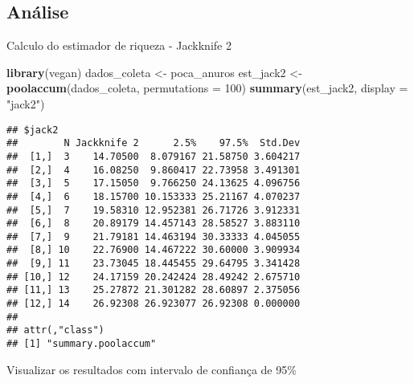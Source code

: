 \documentclass[
]{book}
\newenvironment{Shaded}{\begin{snugshade}}{\end{snugshade}}
\newcommand{\DataTypeTok}[1]{\textcolor[rgb]{0.13,0.29,0.53}{#1}}
\newcommand{\DecValTok}[1]{\textcolor[rgb]{0.00,0.00,0.81}{#1}}
\newcommand{\KeywordTok}[1]{\textcolor[rgb]{0.13,0.29,0.53}{\textbf{#1}}}
\newcommand{\NormalTok}[1]{#1}
\newcommand{\StringTok}[1]{\textcolor[rgb]{0.31,0.60,0.02}{#1}}
\begin{document}
\hypertarget{anuxe1lise-4}{%
\subsection{Análise}\label{anuxe1lise-4}}

Calculo do estimador de riqueza - Jackknife 2

\begin{Shaded}
\begin{Highlighting}[]
\KeywordTok{library}\NormalTok{(vegan)}
\NormalTok{dados_coleta <-}\StringTok{ }\NormalTok{poca_anuros}
\NormalTok{est_jack2 <-}\StringTok{ }\KeywordTok{poolaccum}\NormalTok{(dados_coleta, }\DataTypeTok{permutations =} \DecValTok{100}\NormalTok{)}
\KeywordTok{summary}\NormalTok{(est_jack2, }\DataTypeTok{display =} \StringTok{"jack2"}\NormalTok{)}
\end{Highlighting}
\end{Shaded}

\begin{verbatim}
## $jack2
##        N Jackknife 2      2.5%    97.5%  Std.Dev
##  [1,]  3    14.70500  8.079167 21.58750 3.604217
##  [2,]  4    16.08250  9.860417 22.73958 3.491301
##  [3,]  5    17.15050  9.766250 24.13625 4.096756
##  [4,]  6    18.15700 10.153333 25.21167 4.070237
##  [5,]  7    19.58310 12.952381 26.71726 3.912331
##  [6,]  8    20.89179 14.457143 28.58527 3.883110
##  [7,]  9    21.79181 14.463194 30.33333 4.045055
##  [8,] 10    22.76900 14.467222 30.60000 3.909934
##  [9,] 11    23.73045 18.445455 29.64795 3.341428
## [10,] 12    24.17159 20.242424 28.49242 2.675710
## [11,] 13    25.27872 21.301282 28.60897 2.375056
## [12,] 14    26.92308 26.923077 26.92308 0.000000
## 
## attr(,"class")
## [1] "summary.poolaccum"
\end{verbatim}

Visualizar os resultados com intervalo de confiança de 95\%
\end{document}
